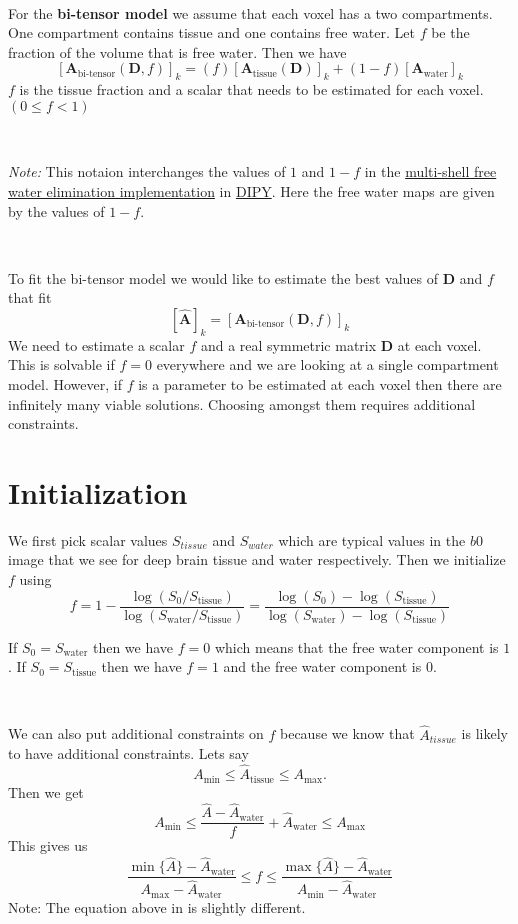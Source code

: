 \documentclass[12pt]{article}
\newcommand{\vect}[1]{\mathbf{#1}}
\newcommand{\Amin}{A_{\text{min}}}
\newcommand{\Amax}{A_{\text{max}}}
\newcommand{\Atissue}{\vect{A}_{\text{tissue}}}
\newcommand{\Stissue}{S_{\text{tissue}}}
\newcommand{\Awater}{\vect{A}_{\text{water}}}
\newcommand{\Swater}{S_{\text{water}}}
\newcommand{\Abitensor}{\vect{A}_{\text{bi-tensor}}}
\newcommand{\Ahattissue}{\hat{A}_{\text{tissue}}}
\newcommand{\Ahatwater}{\hat{A}_{\text{water}}}
\begin{document}
\ 

\noindent
For the \textbf{bi-tensor model} we assume that each voxel has a two
compartments. One compartment contains tissue and one contains free water. Let
$f$ be the fraction of the volume that is free water. Then we have 
$$[\Abitensor(\vect{D},f)]_k = 
  (f)[\Atissue(\vect{D})]_k +
  (1-f) [\Awater]_k$$
$f$ is the tissue fraction and a scalar that needs to be estimated for each
voxel. $(0 \leq f < 1)$

\ 

\noindent
\textit{Note:} This notaion interchanges the values of $1$ and $1-f$ in the
\href{http://nipy.org/dipy/examples\_built/reconst\_fwdti.html}{multi-shell
free water elimination implementation} in \href{http://nipy.org/dipy}{DIPY}.
Here the free water maps are given by the values of $1-f$. 

\ 

\noindent
To fit the bi-tensor model we would like to estimate the best values of
$\vect{D}$ and $f$ that fit $$ [\hat{\vect{A}}]_k =
[\vect{A}_{\text{bi-tensor}}(\vect{D}, f)]_k$$ We need to estimate a scalar
$f$ and a real symmetric matrix $\vect{D}$ at each voxel. This is solvable if
$f=0$ everywhere and we are looking at a single compartment model. However, if
$f$ is a parameter to be estimated at each voxel then there are infinitely many
viable solutions. Choosing amongst them requires additional constraints. 

\section{Initialization}
We first pick scalar values $S_{tissue}$ and $S_{water}$ which are typical
values in the $b0$ image that we see for deep brain tissue and water
respectively. Then we initialize $f$ using
$$f = 1 - \frac{\log(S_0 / \Stissue)}{\log(\Swater / \Stissue)} = 
\frac{\log(S_0) - \log(\Stissue)}{\log(\Swater) - \log(\Stissue)}$$

\noindent
If $S_0 = \Swater$ then we have $f = 0$ which means that the free water
component is $1$. If $S_0 = \Stissue$ then we have $f = 1$ and the free water
component is $0$. 

\ 

\noindent
We can also put additional constraints on $f$ because we know that 
$\hat{A}_{tissue}$ is likely to have additional constraints. Lets say
$$ \Amin \leq \Ahattissue \leq \Amax.$$ Then we get
$$ \Amin \leq \frac{\hat{A} - \Ahatwater}{f} + \Ahatwater \leq \Amax$$
This gives us 
$$\frac{\min{\{\hat{A}\}}-\Ahatwater}{\Amax - \Ahatwater} \leq f \leq
\frac{\max{\{\hat{A}}\}-\Ahatwater}{\Amin - \Ahatwater}$$
Note: The equation above in \cite{Pasternak2009} is slightly different.
\end{document}
